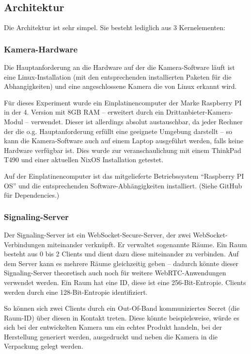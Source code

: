 \documentclass[journal]{IEEEtran}
\begin{document}
\begin{twocolumn}
\subsection{Architektur}

Die Architektur ist sehr simpel. Sie besteht lediglich aus 3 Kernelementen:

\subsubsection{Kamera-Hardware}

Die Hauptanforderung an die Hardware auf der die Kamera-Software läuft ist eine
Linux-Installation (mit den entsprechenden installierten Paketen für die
Abhangigkeiten) und eine angeschlossene Kamera die von Linux erkannt wird.

Für dieses Experiment wurde ein Einplatinencomputer der Marke Raspberry PI in
der 4. Version mit 8GB RAM – erweitert durch ein Drittanbieter-Kamera-Modul –
verwendet. Dieser ist allerdings absolut austauschbar, da jeder Rechner der
die o.g. Hauptanforderung erfüllt eine geeignete Umgebung darstellt – so kann
die Kamera-Software auch auf einem Laptop ausgeführt werden, falls keine
Hardware verfügbar ist. Dies wurde zur veranschaulichung mit einem ThinkPad
T490 und einer aktuellen NixOS Installation getestet.

Auf der Einplatinencomputer ist das mitgelieferte Betriebssystem ``Raspberry PI
OS'' und die entsprechenden Software-Abhängigkeiten installiert. (Siehe GitHub
für Dependencies.)

\subsubsection{Signaling-Server}

Der Signaling-Server ist ein WebSocket-Secure-Server, der zwei
WebSocket-Verbindungen miteinander verknüpft. Er verwaltet sogenannte Räume.
Ein Raum besteht aus 0 bis 2 Clients und dient dazu diese miteinander zu
verbinden. Auf dem Server kann es mehrere Räume gleichzeitig geben – dadurch
könnte dieser Signaling-Server theoretisch auch noch für weitere
WebRTC-Anwendungen verwendet werden. Ein Raum hat eine ID, diese ist eine
256-Bit-Entropie. Clients werden durch eine 128-Bit-Entropie identifiziert.

So können sich zwei Clients durch ein Out-Of-Band kommuniziertes Secret (die
Raum-ID) über diesen in Kontakt treten. Diese könnte beispielsweise, würde es
sich bei der entwickelten Kamera um ein echtes Produkt handeln, bei der
Herstellung generiert werden, ausgedruckt und neben die Kamera in die
Verpackung gelegt werden.


\end{twocolumn}
\end{document}
